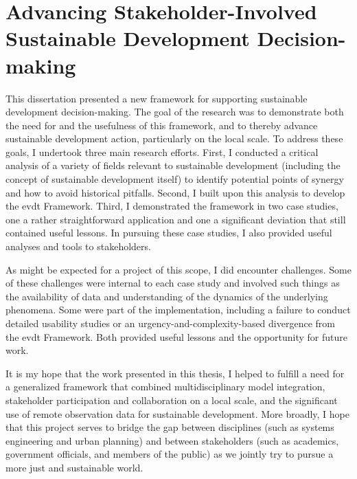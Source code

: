 \section{Advancing Stakeholder-Involved Sustainable Development Decision-making}

This dissertation presented a new framework for supporting sustainable development decision-making. The goal of the research was to demonstrate both the need for and the usefulness of this framework, and to thereby advance sustainable development action, particularly on the local scale. To address these goals, I undertook three main research efforts. First, I conducted a critical analysis of a variety of fields relevant to sustainable development (including the concept of sustainable development itself) to identify potential points of synergy and how to avoid historical pitfalls. Second, I built upon this analysis to develop the \acf{evdt} Framework. Third, I demonstrated the framework in two case studies, one a rather straightforward application and one a significant deviation that still contained useful lessons. In pursuing these case studies, I also provided useful analyses and tools to stakeholders.

As might be expected for a project of this scope, I did encounter challenges. Some of these challenges were internal to each case study and involved such things as the availability of data and understanding of the dynamics of the underlying phenomena. Some were part of the implementation, including a failure to conduct detailed usability studies or an urgency-and-complexity-based divergence from the \ac{evdt} Framework. Both provided useful lessons and the opportunity for future work.

It is my hope that the work presented in this thesis, I helped to fulfill a need for a generalized framework that combined multidisciplinary model integration, stakeholder participation and collaboration on a local scale, and the significant use of remote observation data for sustainable development. More broadly, I hope that this project serves to bridge the gap between disciplines (such as systems engineering and urban planning) and between stakeholders (such as academics, government officials, and members of the public) as we jointly try to pursue a more just and sustainable world.


